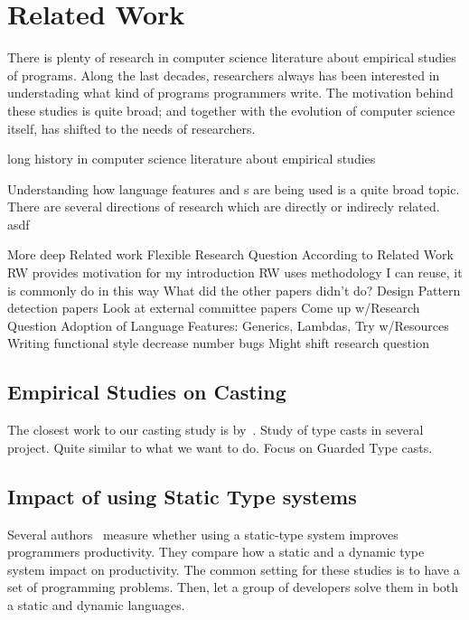 
\chapter{Related Work}

There is plenty of research in computer science literature about empirical studies of programs.
Along the last decades, researchers always has been interested in understading what kind of programs programmers write.
The motivation behind these studies is quite broad; and together with the evolution of computer science itself,
has shifted to the needs of researchers.


long history in computer science literature about empirical studies 

\cite{SPE:SPE4380010203}


\cite{SPE:SPE4380070605}

Understanding how language features and \api{}s are being used is a quite broad topic.
There are several directions of research which are directly or indirecly related.
asdf

More deep Related work
Flexible Research Question
According to Related Work
RW provides motivation for my introduction
RW uses methodology I can reuse, it is commonly do in this way
What did the other papers didn't do?
Design Pattern detection papers
Look at external committee papers
Come up w/Research Question
Adoption of Language Features: Generics, Lambdas, Try w/Resources
Writing functional style decrease number bugs
Might shift research question


\section{Empirical Studies on Casting}

The closest work to our casting study is by~\cite{Winther:2011:GTP:2076674.2076680}.
Study of type casts in several project.
Quite similar to what we want to do.
Focus on Guarded Type casts.


\section{Impact of using Static Type systems}

Several authors~\cite{Stuchlik:2011:SVD:2047849.2047861,Mayer:2012:ESI:2384616.2384666,7911881} measure whether using a static-type system improves programmers productivity.
They compare how a static and a dynamic type system impact on productivity.
The common setting for these studies is to have a set of programming problems.
Then, let a group of developers solve them in both a static and dynamic languages.

